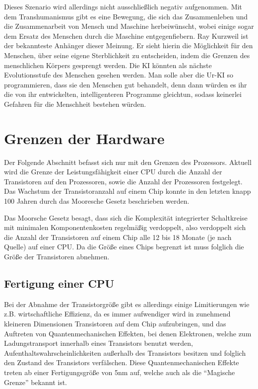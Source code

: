 Dieses Szenario wird allerdings nicht ausschließlich negativ aufgenommen.
Mit dem Transhumanismus gibt es eine Bewegung, die sich das Zusammenleben und die Zusammenarbeit von Mensch und Maschine herbeiwünscht, wobei einige sogar dem Ersatz des Menschen durch die Maschine entgegenfiebern.
Ray Kurzweil ist der bekannteste Anhänger dieser Meinung.
Er sieht hierin die Möglichkeit für den Menschen, über seine eigene Sterblichkeit zu entscheiden, indem die Grenzen des menschlichen Körpers gesprengt werden.
Die KI könnten als nächste Evolutionsstufe des Menschen gesehen werden.
Man solle aber die Ur-KI so programmieren, dass sie den Menschen gut behandelt, denn dann würden es ihr die von ihr entwickelten, intelligenteren Programme gleichtun, sodass keinerlei Gefahren für die Menschheit bestehen würden.

\section{Grenzen der Hardware}
Der Folgende Abschnitt befasst sich nur mit den Grenzen des Prozessors.
Aktuell wird die Grenze der Leistungsfähigkeit einer CPU durch die Anzahl der Transistoren auf den Prozessoren, sowie die Anzahl der Prozessoren festgelegt.
Das Wachstum der Transistoranzahl auf einem Chip konnte in den letzten knapp 100 Jahren durch das Mooresche Gesetz beschrieben werden.

Das Moorsche Gesetz besagt, dass sich die Komplexität integrierter Schaltkreise mit minimalen Komponentenkosten regelmäßig verdoppelt, also verdoppelt sich die Anzahl der Transistoren auf einem Chip alle 12 bis 18 Monate (je nach Quelle) auf einer CPU.
Da die Größe eines Chips begrenzt ist muss folglich die Größe der Transistoren abnehmen.

\subsection{Fertigung einer CPU}

Bei der Abnahme der Transistorgröße gibt es allerdings einige Limitierungen wie z.B. wirtschaftliche Effizienz, da es immer aufwendiger wird in zunehmend kleineren Dimensionen Transistoren auf dem Chip aufzubringen,
und das Auftreten von Quantenmechanischen Effekten, bei denen Elektronen, welche zum Ladungstransport innerhalb eines Transistors benutzt werden,
Aufenthaltswahrscheinlichkeiten außerhalb des Transistors besitzen und folglich den Zustand des Transistors verfälschen.
Diese Quantenmechanischen Effekte treten ab einer Fertigungsgröße von 5nm auf, welche auch als die \enquote{Magische Grenze} bekannt ist.

